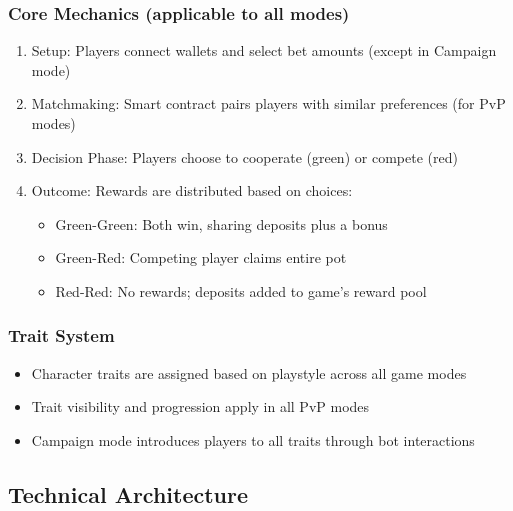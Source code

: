 \documentclass[]{article}
\begin{document}
\hypertarget{core-mechanics-applicable-to-all-modes}{%
\subsubsection{Core Mechanics (applicable to all
modes)}\label{core-mechanics-applicable-to-all-modes}}

\begin{enumerate}
\def\labelenumi{\arabic{enumi}.}
\tightlist
\item
  Setup: Players connect wallets and select bet amounts (except in
  Campaign mode)
\item
  Matchmaking: Smart contract pairs players with similar preferences
  (for PvP modes)
\item
  Decision Phase: Players choose to cooperate (green) or compete (red)
\item
  Outcome: Rewards are distributed based on choices:

  \begin{itemize}
  \tightlist
  \item
    Green-Green: Both win, sharing deposits plus a bonus
  \item
    Green-Red: Competing player claims entire pot
  \item
    Red-Red: No rewards; deposits added to game's reward pool
  \end{itemize}
\end{enumerate}

\hypertarget{trait-system}{%
\subsubsection{Trait System}\label{trait-system}}

\begin{itemize}
\tightlist
\item
  Character traits are assigned based on playstyle across all game modes
\item
  Trait visibility and progression apply in all PvP modes
\item
  Campaign mode introduces players to all traits through bot
  interactions
\end{itemize}

\hypertarget{technical-architecture}{%
\subsection{Technical Architecture}\label{technical-architecture}}
\end{document}
